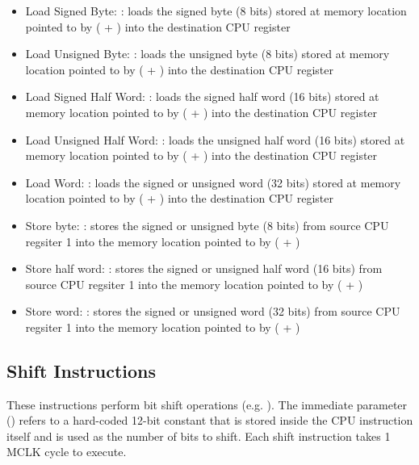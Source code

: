 \documentclass[11pt,pdftex,portrait,letterpaper]{article}
\begin{document}
\begin{itemize}
	\item Load Signed Byte: : loads the signed byte (8 bits) stored at memory location pointed to by ( + ) into the destination CPU register 
	\item Load Unsigned Byte: : loads the unsigned byte (8 bits) stored at memory location pointed to by ( + ) into the destination CPU register 
	\item Load Signed Half Word: : loads the signed half word (16 bits) stored at memory location pointed to by ( + ) into the destination CPU register 
	\item Load Unsigned Half Word: : loads the unsigned half word (16 bits) stored at memory location pointed to by ( + ) into the destination CPU register 
	\item Load Word: : loads the signed or unsigned word (32 bits) stored at memory location pointed to by ( + ) into the destination CPU register 
	\item Store byte: : stores the signed or unsigned byte (8 bits) from source CPU regsiter 1  into the memory location pointed to by ( + )
	\item Store half word: : stores the signed or unsigned half word (16 bits) from source CPU regsiter 1  into the memory location pointed to by ( + )
	\item Store word: : stores the signed or unsigned word (32 bits) from source CPU regsiter 1  into the memory location pointed to by ( + )
\end{itemize}

\subsection{Shift Instructions}

These instructions perform bit shift operations (e.g. \cinline{<<}). The immediate parameter () refers to a hard-coded 12-bit constant that is stored inside the CPU instruction itself and is used as the number of bits to shift. Each shift instruction takes 1 MCLK cycle to execute.
\end{document}
